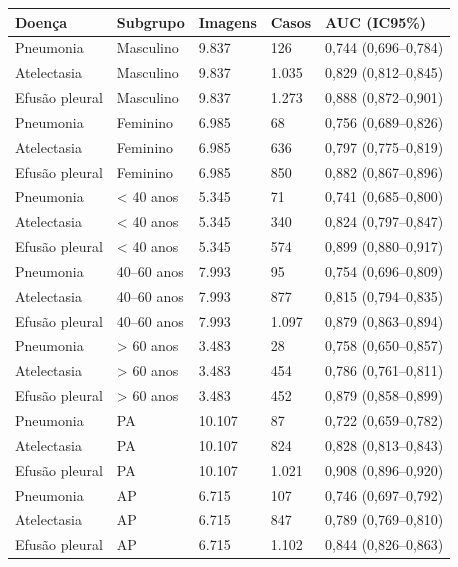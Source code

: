 \begin{tabular}{lllll}
\toprule
Doença & Subgrupo & Imagens & Casos & AUC (IC95\%) \\
\midrule
Pneumonia & Masculino & 9.837 & 126 & 0,744 (0,696–0,784) \\
Atelectasia & Masculino & 9.837 & 1.035 & 0,829 (0,812–0,845) \\
Efusão pleural & Masculino & 9.837 & 1.273 & 0,888 (0,872–0,901) \\
Pneumonia & Feminino & 6.985 & 68 & 0,756 (0,689–0,826) \\
Atelectasia & Feminino & 6.985 & 636 & 0,797 (0,775–0,819) \\
Efusão pleural & Feminino & 6.985 & 850 & 0,882 (0,867–0,896) \\
Pneumonia & < 40 anos & 5.345 & 71 & 0,741 (0,685–0,800) \\
Atelectasia & < 40 anos & 5.345 & 340 & 0,824 (0,797–0,847) \\
Efusão pleural & < 40 anos & 5.345 & 574 & 0,899 (0,880–0,917) \\
Pneumonia & 40–60 anos & 7.993 & 95 & 0,754 (0,696–0,809) \\
Atelectasia & 40–60 anos & 7.993 & 877 & 0,815 (0,794–0,835) \\
Efusão pleural & 40–60 anos & 7.993 & 1.097 & 0,879 (0,863–0,894) \\
Pneumonia & > 60 anos & 3.483 & 28 & 0,758 (0,650–0,857) \\
Atelectasia & > 60 anos & 3.483 & 454 & 0,786 (0,761–0,811) \\
Efusão pleural & > 60 anos & 3.483 & 452 & 0,879 (0,858–0,899) \\
Pneumonia & PA & 10.107 & 87 & 0,722 (0,659–0,782) \\
Atelectasia & PA & 10.107 & 824 & 0,828 (0,813–0,843) \\
Efusão pleural & PA & 10.107 & 1.021 & 0,908 (0,896–0,920) \\
Pneumonia & AP & 6.715 & 107 & 0,746 (0,697–0,792) \\
Atelectasia & AP & 6.715 & 847 & 0,789 (0,769–0,810) \\
Efusão pleural & AP & 6.715 & 1.102 & 0,844 (0,826–0,863) \\
\bottomrule
\end{tabular}
